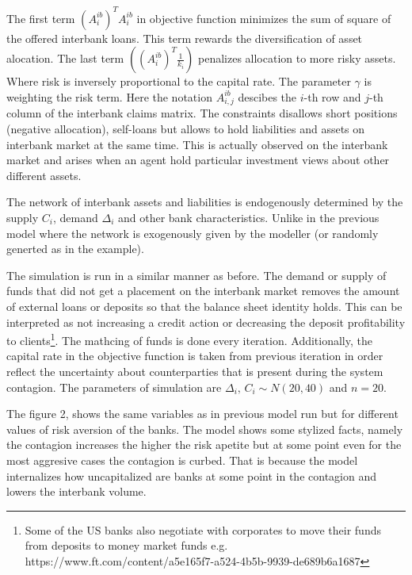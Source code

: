 \documentclass{article}
\begin{document}
The first term $(A^{ib}_i)^T A^{ib}_i$ in objective function minimizes the sum of square of the offered interbank loans. This term rewards the diversification of asset alocation. The last term $\left((A^{ib}_i)^T \frac{1}{k_i}\right)$ penalizes allocation to more risky assets. Where risk is inversely proportional to the capital rate. The parameter $\gamma$ is weighting the risk term. Here the notation $A^{ib}_{i,j}$ descibes the $i$-th row and $j$-th column of the interbank claims matrix. The constraints disallows short positions (negative allocation), self-loans but allows to hold liabilities and assets on interbank market at the same time. This is actually observed on the interbank market and arises when an agent hold particular investment views about other different assets. 

The network of interbank assets and liabilities is endogenously determined by the supply $C_i$, demand $\Delta_i$ and other bank characteristics. Unlike in the previous model where the network is exogenously given by the modeller (or randomly generted as in the example). 

The simulation is run in a similar manner as before. The demand or supply of funds that did not get a placement on the interbank market removes the amount of external loans or deposits so that the balance sheet identity holds. This can be interpreted as not increasing a credit action or decreasing the deposit profitability to clients\footnote[1]{Some of the US banks also negotiate with corporates to move their funds from deposits to money market funds e.g. https://www.ft.com/content/a5e165f7-a524-4b5b-9939-de689b6a1687}. The mathcing of funds is done every iteration. Additionally, the capital rate in the objective function is taken from previous iteration in order reflect the uncertainty about counterparties that is present during the system contagion. The parameters of simulation are $\Delta_i , \, C_i \sim N(20, 40)$ and $n = 20$.
 

The figure 2, shows the same variables as in previous model run but for different values of risk aversion of the banks. The model shows some stylized facts, namely the contagion increases the higher the risk apetite but at some point even for the most aggresive cases the contagion is curbed. That is because the model internalizes how uncapitalized are banks at some point in the contagion and lowers the interbank volume. 
\end{document}
